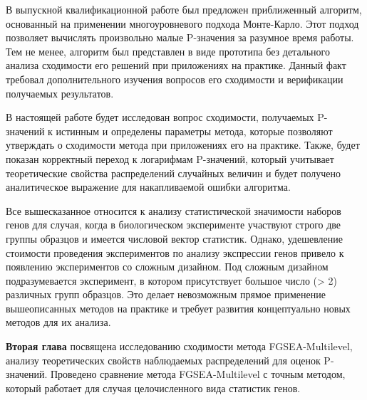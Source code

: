 В выпускной квалификационной работе \cite{KorotkevichVKR} был предложен приближенный алгоритм, основанный на применении многоуровневого подхода Монте-Карло.
Этот подход позволяет вычислять произвольно малые P-значения за разумное время работы.
Тем не менее, алгоритм был представлен в виде прототипа без детального анализа сходимости его решений при приложениях на практике.
Данный факт требовал дополнительного изучения вопросов его сходимости и верификации получаемых результатов.

В настоящей работе будет исследован вопрос сходимости, получаемых P-значений к истинным и определены параметры метода, которые позволяют утверждать о сходимости метода при приложениях его на практике.
Также, будет показан корректный переход к логарифмам P-значений, который учитывает теоретические свойства распределений случайных величин и будет получено аналитическое выражение для накапливаемой ошибки алгоритма.

Все вышесказанное относится к анализу статистической значимости наборов генов для случая, когда в биологическом эксперименте участвуют строго две группы образцов и имеется числовой вектор статистик.
Однако, удешевление стоимости проведения экспериментов по анализу экспрессии генов привело к появлению экспериментов со сложным дизайном.
Под сложным дизайном подразумевается эксперимент, в котором присутствует  большое число (> 2) различных групп образцов.
Это делает невозможным прямое применение вышеописанных методов на практике и требует развития концептуально новых методов для их анализа.




\textbf{Вторая глава} посвящена исследованию сходимости метода FGSEA-Multilevel, анализу теоретических свойств наблюдаемых распределений для оценок P-значений.
Проведено сравнение метода FGSEA-Multilevel с точным методом, который работает для случая целочисленного вида статистик генов.

